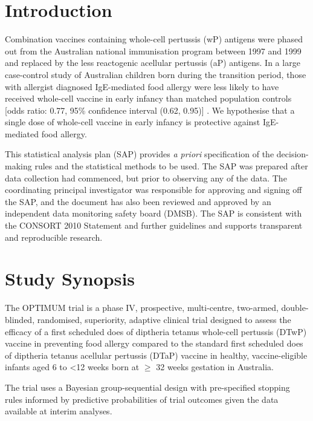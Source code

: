\documentclass{bmcart}
\begin{document}

\section*{Introduction}

Combination vaccines containing whole-cell pertussis (wP) antigens were phased out from the Australian national immunisation program between 1997 and 1999 and replaced by the less reactogenic acellular pertussis (aP) antigens.
In a large case-control study of Australian children born during the transition period, those with allergist diagnosed IgE-mediated food allergy were less likely to have received whole-cell vaccine in early infancy than matched population controls [odds ratio: 0.77, 95\% confidence interval (0.62, 0.95)] \cite{estcourt2020whole}.
We hypothesise that a single dose of whole-cell vaccine in early infancy is protective against IgE-mediated food allergy.

This statistical analysis plan (SAP) provides \textit{a priori} specification of the decision-making rules and the statistical methods to be used. 
The SAP was prepared after data collection had commenced, but prior to observing any of the data. 
The coordinating principal investigator was responsible for approving and signing off the SAP, and the document has also been reviewed and approved by an independent data monitoring safety board (DMSB). 
The SAP is consistent with the CONSORT 2010 Statement and further guidelines and supports transparent and reproducible research.

\section*{Study Synopsis}

The OPTIMUM trial is a phase IV, prospective, multi-centre, two-armed, double-blinded, randomised, superiority, adaptive clinical trial designed to assess the efficacy of a first scheduled does of diptheria tetanus whole-cell pertussis (DTwP) vaccine in preventing food allergy compared to the standard first scheduled does of diptheria tetanus acellular pertussis (DTaP) vaccine in healthy, vaccine-eligible infants aged 6 to \textless12 weeks born at \(\geq\) 32 weeks gestation in Australia.

The trial uses a Bayesian group-sequential design with pre-specified stopping rules informed by predictive probabilities of trial outcomes given the data available at interim analyses.
\end{document}
